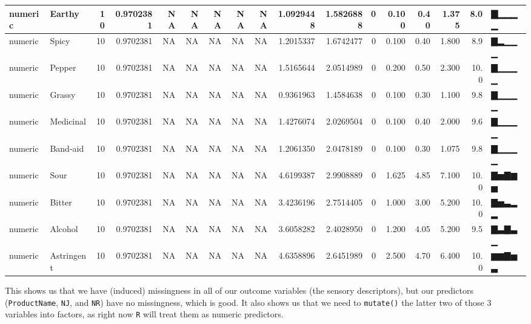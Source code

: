 \documentclass[
]{book}
\begin{document}
\begin{tabular}{l|l|r|r|r|r|r|r|r|r|r|r|r|r|r|r|l}
\hline
numeric & Earthy & 10 & 0.9702381 & NA & NA & NA & NA & NA & 1.0929448 & 1.5826888 & 0 & 0.100 & 0.40 & 1.375 & 8.0 & ▇▁▁▁▁\\
\hline
numeric & Spicy & 10 & 0.9702381 & NA & NA & NA & NA & NA & 1.2015337 & 1.6742477 & 0 & 0.100 & 0.40 & 1.800 & 8.9 & ▇▂▁▁▁\\
\hline
numeric & Pepper & 10 & 0.9702381 & NA & NA & NA & NA & NA & 1.5165644 & 2.0514989 & 0 & 0.200 & 0.50 & 2.300 & 10.0 & ▇▁▁▁▁\\
\hline
numeric & Grassy & 10 & 0.9702381 & NA & NA & NA & NA & NA & 0.9361963 & 1.4584638 & 0 & 0.100 & 0.30 & 1.100 & 9.8 & ▇▁▁▁▁\\
\hline
numeric & Medicinal & 10 & 0.9702381 & NA & NA & NA & NA & NA & 1.4276074 & 2.0269504 & 0 & 0.100 & 0.40 & 2.000 & 9.6 & ▇▁▁▁▁\\
\hline
numeric & Band-aid & 10 & 0.9702381 & NA & NA & NA & NA & NA & 1.2061350 & 2.0478189 & 0 & 0.100 & 0.30 & 1.075 & 9.8 & ▇▁▁▁▁\\
\hline
numeric & Sour & 10 & 0.9702381 & NA & NA & NA & NA & NA & 4.6199387 & 2.9908889 & 0 & 1.625 & 4.85 & 7.100 & 10.0 & ▇▅▇▆▅\\
\hline
numeric & Bitter & 10 & 0.9702381 & NA & NA & NA & NA & NA & 3.4236196 & 2.7514405 & 0 & 1.000 & 3.00 & 5.200 & 10.0 & ▇▅▃▂▂\\
\hline
numeric & Alcohol & 10 & 0.9702381 & NA & NA & NA & NA & NA & 3.6058282 & 2.4028950 & 0 & 1.200 & 4.05 & 5.200 & 9.5 & ▇▃▇▃▁\\
\hline
numeric & Astringent & 10 & 0.9702381 & NA & NA & NA & NA & NA & 4.6358896 & 2.6451989 & 0 & 2.500 & 4.70 & 6.400 & 10.0 & ▆▆▇▅▃\\
\hline
\end{tabular}

This shows us that we have (induced) missingness in all of our outcome variables (the sensory descriptors), but our predictors (\texttt{ProductName}, \texttt{NJ}, and \texttt{NR}) have no missingness, which is good. It also shows us that we need to \texttt{mutate()} the latter two of those 3 variables into factors, as right now \texttt{R} will treat them as numeric predictors.
\end{document}
